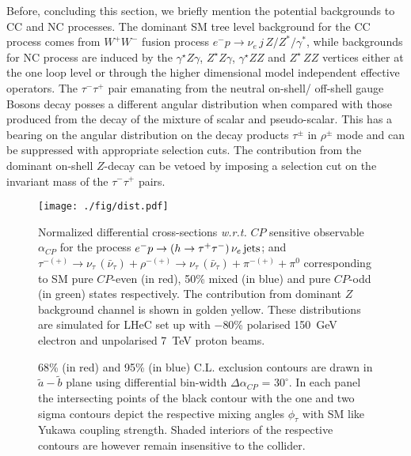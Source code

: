 \documentclass[pdftex,twocolumn,epjc3]{svjour3}          %
\begin{document}
\par Before, concluding  this section, we briefly mention the potential backgrounds to CC and NC processes. The dominant SM tree level background for the CC process  comes from $W^+W^-$ fusion process $e^-p\to \nu_e\,j\,Z/Z^*/\gamma^*$, while backgrounds for NC process are induced by the $\gamma^\star Z\gamma$, $Z^\star Z \gamma $,  $\gamma^\star ZZ $   and $Z^\star\, ZZ$ vertices  either at the one loop level or  through the higher dimensional model independent effective operators. The $\tau^-\tau^+$ pair  emanating from the neutral on-shell/ off-shell gauge Bosons decay posses a different angular distribution when compared with those produced from the decay of the mixture of scalar and pseudo-scalar. This has a bearing on the angular distribution on the decay products $\tau^\pm$ in $\rho^\pm$ mode and can be suppressed with appropriate selection cuts. The contribution from the dominant on-shell $Z$-decay  can be vetoed by imposing a selection cut on the invariant mass of the $\tau^-\tau^+$ pairs. 
\begin{figure}[t]
	\texttt{[image: ./fig/dist.pdf]}
	\caption{  {\small Normalized differential cross-sections   {\it  w.r.t.} $CP$ sensitive observable $\alpha_{CP}$  for the process  $e^-p\to (h\to \tau^+\tau^-)\, \nu_e\, {\rm jets}$; and $\tau^{-(+)}\to\nu_\tau\,(\bar\nu_\tau) +\rho^{-(+)}\to \nu_\tau\,(\bar\nu_\tau)+\pi^{-(+)}+\pi^0$ corresponding to SM pure $CP$-even (in red), 50\% mixed (in blue) and pure $CP$-odd  (in green) states respectively. The contribution from dominant $Z$ background channel is shown in golden yellow. These distributions are simulated for LHeC set up with $-$80\% polarised 150~GeV electron   and unpolarised 7~TeV proton beams.}}
	\label{fig:distLHeC}
\end{figure}
%
%
\begin{figure*}[t]
\centering
{}
\caption{  \small 68\% (in red) and 95\% (in blue)   C.L. exclusion contours are drawn in  $\tilde a-\tilde b$ plane using differential bin-width $\Delta\alpha_{CP}$ = $30^\circ$. In each panel the  intersecting points of the black contour  with the one and two  sigma contours   depict the respective mixing angles $\phi_\tau$ with SM like Yukawa coupling strength. Shaded interiors of the respective contours are however remain insensitive to the collider.}
\label{fig:CC_Ee150}
\end{figure*}
\end{document}
